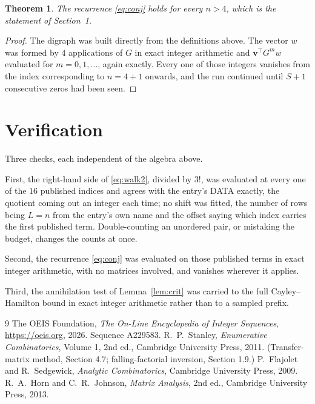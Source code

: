 \documentclass[11pt,a4paper]{article}
\theoremstyle{plain}
\newtheorem{theorem}{Theorem}
\theoremstyle{definition}
\begin{document}
\begin{theorem}
The recurrence \eqref{eq:conj} holds for every $n>4$, which is the statement of
Section~1.
\end{theorem}

\begin{proof}
The digraph was built directly from the definitions above. The vector $w$ was formed by
$4$ applications of $G$ in exact integer arithmetic and $\mathbf{v}^{\!\top}G^{m}w$
evaluated for $m=0,1,\dots$, again exactly. Every one of those integers vanishes from the
index corresponding to $n=4+1$ onwards, and the run continued until $S+1$ consecutive
zeros had been seen.
\end{proof}

\section{Verification}

Three checks, each independent of the algebra above.

First, the right-hand side of \eqref{eq:walk2}, divided by $3!$, was evaluated at every
one of the $16$ published indices and agrees with the entry's DATA exactly, the quotient
coming out an integer each time; no shift was fitted, the number of rows being $L=n$
from the entry's own name and the offset saying which index carries the first published term.
Double-counting an unordered pair, or mistaking the budget, changes the counts at once.

Second, the recurrence \eqref{eq:conj} was evaluated on those published terms in exact
integer arithmetic, with no matrices involved, and vanishes wherever it applies.

Third, the annihilation test of Lemma~\ref{lem:crit} was carried to the full
Cayley--Hamilton bound in exact integer arithmetic rather than to a sampled prefix.

\begin{thebibliography}{9}
 The OEIS Foundation, \emph{The On-Line Encyclopedia of Integer
Sequences}, \url{https://oeis.org}, 2026. Sequence A229583.
 R.~P.~Stanley, \emph{Enumerative Combinatorics}, Volume 1, 2nd ed.,
Cambridge University Press, 2011. (Transfer-matrix method, Section 4.7; falling-factorial
inversion, Section 1.9.)
 P.~Flajolet and R.~Sedgewick, \emph{Analytic Combinatorics}, Cambridge
University Press, 2009.
 R.~A.~Horn and C.~R.~Johnson, \emph{Matrix Analysis}, 2nd ed., Cambridge
University Press, 2013.
\end{thebibliography}
\end{document}

